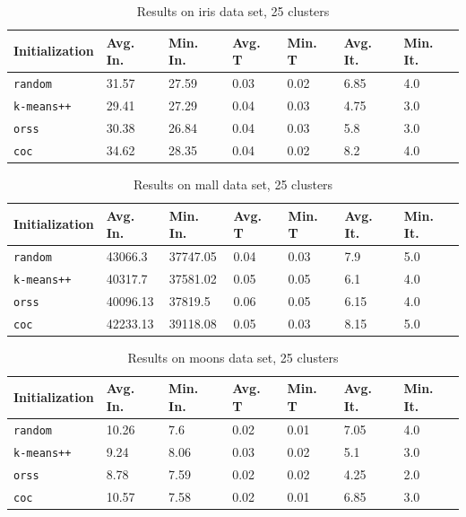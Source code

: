 \documentclass[12pt]{article}
\begin{document}
		\begin{table}[p]
			\begin{center}
				\begin{tabular}{|l|l|l|l|l|l|l|}
					\hline
					Initialization & Avg. In. & Min. In. & Avg. T & Min. T & Avg. It. & Min. It.\\\hline
					\texttt{random} & 31.57 & 27.59 & 0.03 & 0.02 & 6.85 & 4.0\\\hline
					\texttt{k-means++} & 29.41 & 27.29 & 0.04 & 0.03 & 4.75 & 3.0\\\hline
					\texttt{orss} & 30.38 & 26.84 & 0.04 & 0.03 & 5.8 & 3.0\\\hline
					\texttt{coc} & 34.62 & 28.35 & 0.04 & 0.02 & 8.2 & 4.0\\\hline
				\end{tabular}
				\caption{Results on iris data set, 25 clusters}
				\label{tbl:iris25}
			\end{center}
		\end{table}

		\begin{table}[p]
			\begin{center}
				\begin{tabular}{|l|l|l|l|l|l|l|}
					\hline
					Initialization & Avg. In. & Min. In. & Avg. T & Min. T & Avg. It. & Min. It.\\\hline
					\texttt{random} & 43066.3 & 37747.05 & 0.04 & 0.03 & 7.9 & 5.0\\\hline
					\texttt{k-means++} & 40317.7 & 37581.02 & 0.05 & 0.05 & 6.1 & 4.0\\\hline
					\texttt{orss} & 40096.13 & 37819.5 & 0.06 & 0.05 & 6.15 & 4.0\\\hline
					\texttt{coc} & 42233.13 & 39118.08 & 0.05 & 0.03 & 8.15 & 5.0\\\hline
				\end{tabular}
				\caption{Results on mall data set, 25 clusters}
				\label{tbl:mall25}
			\end{center}
		\end{table}

		\begin{table}[p]
			\begin{center}
				\begin{tabular}{|l|l|l|l|l|l|l|}
					\hline
					Initialization & Avg. In. & Min. In. & Avg. T & Min. T & Avg. It. & Min. It.\\\hline
					\texttt{random} & 10.26 & 7.6 & 0.02 & 0.01 & 7.05 & 4.0\\\hline
					\texttt{k-means++} & 9.24 & 8.06 & 0.03 & 0.02 & 5.1 & 3.0\\\hline
					\texttt{orss} & 8.78 & 7.59 & 0.02 & 0.02 & 4.25 & 2.0\\\hline
					\texttt{coc} & 10.57 & 7.58 & 0.02 & 0.01 & 6.85 & 3.0\\\hline
				\end{tabular}
				\caption{Results on moons data set, 25 clusters}
				\label{tbl:moons25}
			\end{center}
		\end{table}
\end{document}

